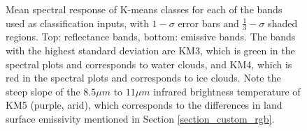 \documentclass[12pt]{article}
\begin{document}
\begin{figure}[h!]
    \centering

    \begin{center}
    \end{center}

    \caption{Mean spectral response of K-means classes for each of the bands used as classification inputs, with $1-\sigma$ error bars and $\frac{1}{3}-\sigma$ shaded regions. Top: reflectance bands, bottom: emissive bands. The bands with the highest standard deviation are KM3, which is green in the spectral plots and corresponds to water clouds, and KM4, which is red in the spectral plots and corresponds to ice clouds. Note the steep slope of the $8.5\mu m$ to $11\mu m$ infrared brightness temperature of KM5 (purple, arid), which corresponds to the differences in land surface emissivity mentioned in Section \ref{section_custom_rgb}.}
    \label{km_spectra}
\end{figure}
\end{document}
